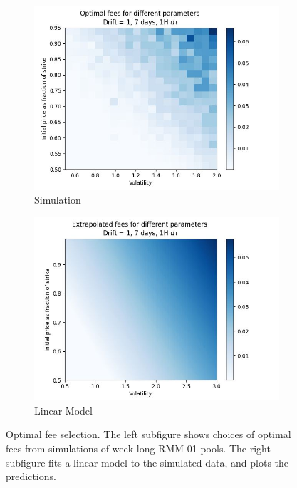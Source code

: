 \documentclass[hidelinks, 12pt]{article}
\begin{document}
\begin{figure}[h!]
    \centering
    \hfill
    \begin{subfigure}[b]{0.49\textwidth}
        \centering
        \includegraphics[width=\textwidth]{fee/simulation.png}
        \caption{Simulation}
        \label{fig:fee:simulation}
    \end{subfigure}
    \hfill
    \begin{subfigure}[b]{0.49\textwidth}
        \centering
        \includegraphics[width=\textwidth]{fee/reconstruction.png}
        \caption{Linear Model}
        \label{fig:fee:reconstruction}
    \end{subfigure}
    \caption{Optimal fee selection. The left subfigure shows choices of optimal fees from simulations of week-long RMM-01 pools. The right subfigure fits a linear model to the simulated data, and plots the predictions.}
    \label{fig:fee}
\end{figure}
\end{document}

